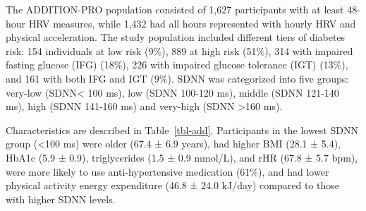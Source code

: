 \documentclass[
  a4paper,
  headsepline=true,
  open=any]{scrbook}
\begin{document}
The ADDITION-PRO population consisted of 1,627 participants with at
least 48-hour HRV measures, while 1,432 had all hours represented with
hourly HRV and physical acceleration. The study population included
different tiers of diabetes risk: 154 individuals at low risk (9\%), 889
at high risk (51\%), 314 with impaired fasting glucose (IFG) (18\%), 226
with impaired glucose tolerance (IGT) (13\%), and 161 with both IFG and
IGT (9\%). SDNN was categorized into five groups: very-low
(SDNN\textless{} 100 ms), low (SDNN 100-120 ms), middle (SDNN 121-140
ms), high (SDNN 141-160 ms) and very-high (SDNN \textgreater160 ms).

Characteristics are described in Table~\ref{tbl-add}. Participants in
the lowest SDNN group (\textless100 ms) were older (67.4 ± 6.9 years),
had higher BMI (28.1 ± 5.4), HbA1c (5.9 ± 0.9), triglycerides (1.5 ± 0.9
mmol/L), and rHR (67.8 ± 5.7 bpm), were more likely to use
anti-hypertensive medication (61\%), and had lower physical activity
energy expenditure (46.8 ± 24.0 kJ/day) compared to those with higher
SDNN levels.

\end{document}
